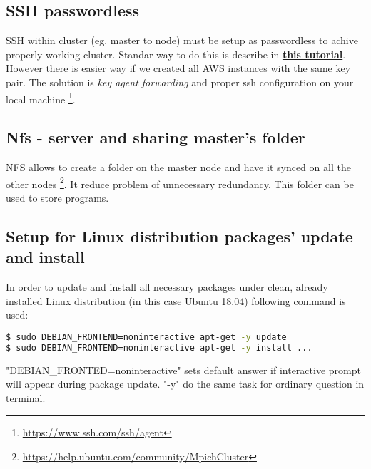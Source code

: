 \documentclass[11pt]{article}
\begin{document}

\subsection{SSH passwordless}
SSH within cluster (eg. master to node) must be setup as passwordless to achive properly working cluster. Standar way to do this is describe in \textbf{\hyperlink{https://help.ubuntu.com/community/MpichCluster}{this tutorial}}. However there is easier way if we created all AWS instances with the same key pair. The solution is \textit{key agent forwarding} and proper ssh configuration on your local machine \footnote{\url{https://www.ssh.com/ssh/agent}}. 

\subsection{Nfs - server and sharing master's folder}
NFS allows to create a folder on the master node and have it synced on all the other nodes \footnote{\url{https://help.ubuntu.com/community/MpichCluster}}. It reduce problem of unnecessary redundancy.  This folder can be used to store programs. 

\subsection{Setup for Linux distribution packages' update and install}
In order to update and install all necessary packages under clean, already installed Linux distribution (in this case Ubuntu 18.04) following command is used:
\begin{lstlisting}[language=bash]
$ sudo DEBIAN_FRONTEND=noninteractive apt-get -y update
$ sudo DEBIAN_FRONTEND=noninteractive apt-get -y install ...
\end{lstlisting}
"DEBIAN\_FRONTED=noninteractive" sets default answer if interactive prompt will appear during package update. "-y" do the same task for ordinary question in terminal.
\end{document}
